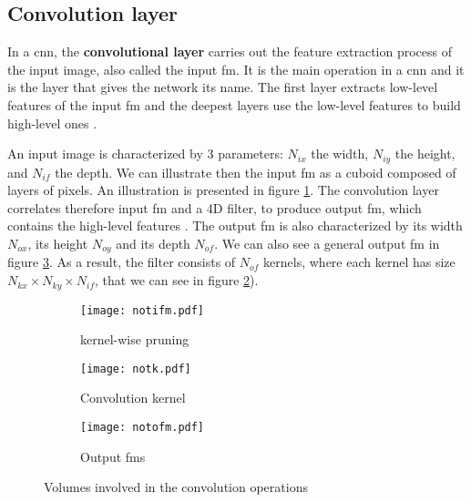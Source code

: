 \subsection{Convolution layer} \label{subs:2dconv}
In a \acrshort{cnn}, the \textbf{convolutional layer} carries out the feature extraction process of the input image, also called the input \acrfull{fm}. It is the main operation in a \acrshort{cnn} and it is the layer that gives the network its name. The first layer extracts low-level features of the input \acrshort{fm} and the deepest layers use the low-level features to build high-level ones \cite{goodfellow_deep_2016}.

An input image is characterized by 3 parameters: \textbf{$N_{ix}$} the width, \textbf{$N_{iy}$} the height, and \textbf{$N_{if}$} the depth. We can illustrate then the input \acrshort{fm} as a cuboid composed of layers of pixels. An illustration is presented in figure \ref{fig:notation:ifm}.
The convolution layer correlates therefore input \acrshort{fm} and a 4D filter, to produce output \acrshort{fm}, which contains the high-level features \cite{zhao_towards_2018}. The output \acrshort{fm} is also characterized by its width $N_{ox}$, its height $N_{oy}$ and its depth $N_{of}$. We can also see a general output \acrshort{fm} in figure \ref{fig:notation:ofm}. As a result, the filter consists of $N_{of}$ kernels, where each kernel has size $N_{kx} \times N_{ky} \times N_{if}$, that we can see in figure \ref{fig:notation:k}).
%
\begin{figure}
    \centering
    \begin{subfigure}{.32\textwidth}
    \centering
    \texttt{[image: notifm.pdf]}
    \caption{kernel-wise pruning}
    \label{fig:notation:ifm}
    \end{subfigure}
    \begin{subfigure}{.32\textwidth}
    \centering
    \texttt{[image: notk.pdf]}
    \caption{Convolution kernel}
    \label{fig:notation:k}
    \end{subfigure}
    \begin{subfigure}{.32\textwidth}
    \centering
    \texttt{[image: notofm.pdf]}
    \caption{Output \acrshort{fm}s}
    \label{fig:notation:ofm}
    \end{subfigure}
    \caption{Volumes involved in the convolution operations}
    \label{fig:notconv}
\end{figure}

